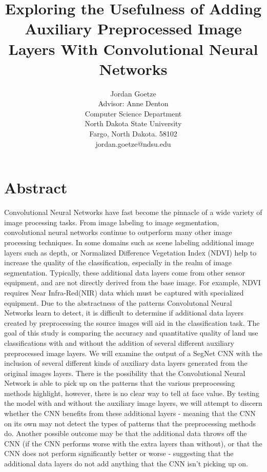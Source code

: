 \documentclass[12pt]{article}
\begin{document}
\title{Exploring the Usefulness of Adding Auxiliary Preprocessed Image Layers With Convolutional Neural Networks}

\author{
Jordan Goetze\\
Advisor: Anne Denton\\
Computer Science Department\\
North Dakota State University\\
Fargo, North Dakota. 58102\\
jordan.goetze@ndsu.edu
}
\date{} 

\maketitle
\thispagestyle{empty}

\section*{\centering Abstract}


Convolutional Neural Networks have fast become the pinnacle of a wide variety of image processing tasks. From image labeling to image segmentation, convolutional neural networks continue to outperform many other image processing techniques. In some domains such as scene labeling additional image layers such as depth, or Normalized Difference Vegetation Index (NDVI) help to increase the quality of the classification, especially in the realm of image segmentation. Typically, these additional data layers come from other sensor equipment, and are not directly derived from the base image. For example, NDVI requires Near Infra-Red(NIR) data which must be captured with specialized equipment. Due to the abstractness of the patterns Convolutonal Neural Networks learn to detect, it is difficult to determine if additional data layers created by preprocessing the source images will aid in the classification task. The goal of this study is comparing the accuracy and quantitative quality of land use classifications with and without the addition of several different auxiliary preprocessed image layers. We will examine the output of a SegNet CNN with the inclusion of several different kinds of auxiliary data layers generated from the original images layers. There is the possibility that the Convolutional Neural Network is able to pick up on the patterns that the various preprocessing methods highlight, however, there is no clear way to tell at face value. By testing the model with and without the auxiliary image layers, we will attempt to discern whether the CNN benefits from these additional layers - meaning that the CNN on its own may not detect the types of patterns that the preprocessing methods do. Another possible outcome may be that the additional data throws off the CNN (if the CNN performs worse with the extra layers than without), or that the CNN does not perform significantly better or worse - suggesting that the additional data layers do not add anything that the CNN isn't picking up on.
\end{document}
